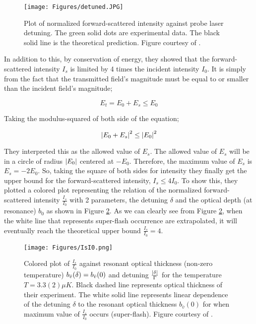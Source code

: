 \begin{figure}
    \centering
    \texttt{[image: Figures/detuned.JPG]}
    \caption[Plot of Forward-Scattered Intensity for 2-Level Medium]{Plot of normalized forward-scattered intensity against probe laser detuning. The green solid dots are experimental data. The black solid line is the theoretical prediction. Figure courtesy of \protect{}.}
    \label{fig: detuned}
\end{figure}

In addition to this, by conservation of energy, they showed that the forward-scattered intensity $I_{s}$ is limited by 4 times the incident intensity $I_{0}$. It is simply from the fact that the transmitted field's magnitude must be equal to or smaller than the incident field's magnitude;

\begin{equation}
    E_{t} = E_{0} + E_{s} \leq E_{0}
\end{equation}

Taking the modulus-squared of both side of the equation;

\begin{equation}
    \abs{E_{0} + E_{s}}^{2} \leq \abs{E_{0}}^{2}
\end{equation}

They interpreted this as the allowed value of $E_{s}$. The allowed value of $E_{s}$ will be in a circle of radius $\abs{E_{0}}$ centered at $-E_{0}$. Therefore, the maximum value of $E_{s}$ is $E_{s} = -2 E_{0}$. So, taking the square of both sides for intensity they finally get the upper bound for the forward-scattered intensity, $I_{s} \leq 4 I_{0}$. To show this, they plotted a colored plot representing the relation of the normalized forward-scattered intensity $\frac{I_{s}}{I_{0}}$ with 2 parameters, the detuning $\delta$ and the optical depth (at resonance) $b_{0}$ as shown in Figure \ref{fig: I_s/I_0}. As we can clearly see from Figure \ref{fig: I_s/I_0}, when the white line that represents super-flash occurrence are extrapolated, it will eventually reach the theoretical upper bound $\frac{I_{s}}{I_{0}} = 4$.

\begin{figure}
    \centering
    \texttt{[image: Figures/IsI0.png]}
    \caption[Surface Plot of Normalized Forward-Scattered Intensity As A Function of Incident Probe Laser Detuning and Resonant Optical Depth $OD$]{Colored plot of $\frac{I_{s}}{I_{0}}$  against resonant optical thickness (non-zero temperature) $b_{\bar{v}}(\delta) = b_{\Bar{v}}(0)$ and detuning $\frac{\abs{\delta}}{\Gamma}$ for the temperature $T = 3.3(2) \mu K$. Black dashed line represents optical thickness of their experiment. The white solid line represents linear dependence of the detuning $\delta$ to the resonant optical thickness $b_{\bar{v}}(0)$ for when maximum value of $\frac{I_{s}}{I_{0}}$ occurs (super-flash). Figure courtesy of \protect{}.}
    \label{fig: I_s/I_0}
\end{figure}

